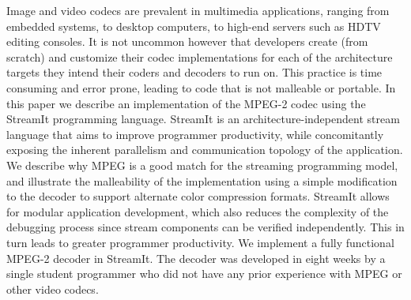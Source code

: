 Image and video codecs are prevalent in multimedia applications,
ranging from embedded systems, to desktop computers, to high-end
servers such as HDTV editing consoles. It is not uncommon however that
developers create (from scratch) and customize their codec
implementations for each of the architecture targets they intend their
coders and decoders to run on. This practice is time consuming and
error prone, leading to code that is not malleable or portable.  In
this paper we describe an implementation of the MPEG-2 codec using the
StreamIt programming language. StreamIt is an architecture-independent
stream language that aims to improve programmer productivity, while
concomitantly exposing the inherent parallelism and communication
topology of the application. We describe why MPEG is a good match for
the streaming programming model, and illustrate the malleability of
the implementation using a simple modification to the decoder to
support alternate color compression formats. StreamIt allows for
modular application development, which also reduces the complexity of
the debugging process since stream components can be verified
independently. This in turn leads to greater programmer productivity.
We implement a fully functional MPEG-2 decoder in StreamIt. The
decoder was developed in eight weeks by a single student programmer
who did not have any prior experience with MPEG or other video
codecs. 
